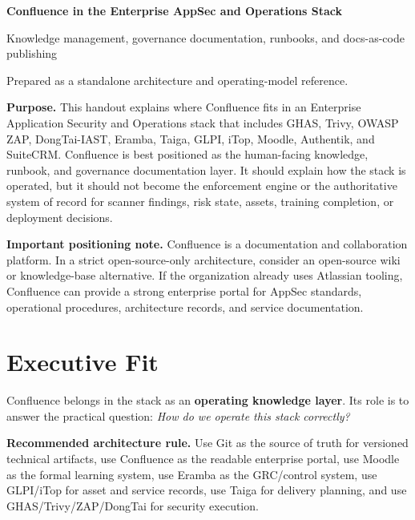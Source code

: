 \documentclass[10pt,letterpaper]{article}
\begin{document}
{\Huge\bfseries\color{Navy} Confluence in the Enterprise AppSec and Operations Stack}\par
{\large\color{GrayText} Knowledge management, governance documentation, runbooks, and docs-as-code publishing}\par
\vspace{4pt}
{\small\color{GrayText} Prepared as a standalone architecture and operating-model reference.}\par
\vspace{10pt}

\begin{summarybox}
\textbf{Purpose.} This handout explains where Confluence fits in an Enterprise Application Security and Operations stack that includes GHAS, Trivy, OWASP ZAP, DongTai-IAST, Eramba, Taiga, GLPI, iTop, Moodle, Authentik, and SuiteCRM. Confluence is best positioned as the human-facing knowledge, runbook, and governance documentation layer. It should explain how the stack is operated, but it should not become the enforcement engine or the authoritative system of record for scanner findings, risk state, assets, training completion, or deployment decisions.
\end{summarybox}

\begin{warningbox}
\textbf{Important positioning note.} Confluence is a documentation and collaboration platform. In a strict open-source-only architecture, consider an open-source wiki or knowledge-base alternative. If the organization already uses Atlassian tooling, Confluence can provide a strong enterprise portal for AppSec standards, operational procedures, architecture records, and service documentation.
\end{warningbox}

\section{Executive Fit}

Confluence belongs in the stack as an \textbf{operating knowledge layer}. Its role is to answer the practical question: \textit{How do we operate this stack correctly?}

\begin{principlebox}
\textbf{Recommended architecture rule.} Use Git as the source of truth for versioned technical artifacts, use Confluence as the readable enterprise portal, use Moodle as the formal learning system, use Eramba as the GRC/control system, use GLPI/iTop for asset and service records, use Taiga for delivery planning, and use GHAS/Trivy/ZAP/DongTai for security execution.
\end{principlebox}
\end{document}
